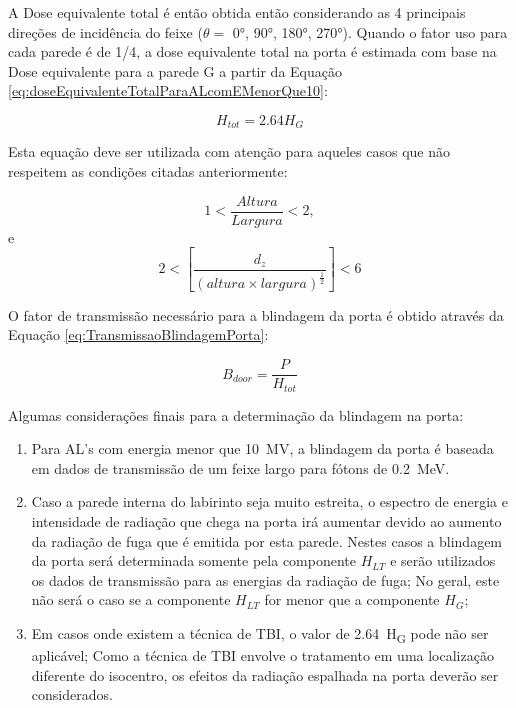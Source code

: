 \documentclass[11pt,a4paper]{article}
\begin{document}
            A Dose equivalente total é então obtida então considerando as 4 principais direções de incidência do feixe ($\theta = $ \ang{0}, \ang{90}, \ang{180}, \ang{270}).  Quando o fator uso para cada parede é de 1/4, a dose equivalente total na porta é estimada com base na Dose equivalente para a parede G a partir da Equação \ref{eq:doseEquivalenteTotalParaALcomEMenorQue10}:

                \begin{equation}
                     H_{tot} = 2.64 H_G
                    \label{eq:doseEquivalenteTotalParaALcomEMenorQue10}
                \end{equation}
                
            Esta equação deve ser utilizada com atenção para aqueles casos que não respeitem as condições citadas anteriormente: 

                $$1 < \frac{Altura}{Largura} < 2, $$ e
                $$2 < \left[\frac{d_z}{\left(altura \times largura\right)^\frac{1}{2}}\right] < 6$$

            O fator de transmissão necessário para a blindagem da porta é obtido através da Equação \ref{eq:TransmissaoBlindagemPorta}:

                \begin{equation}
                    B_{door} = \frac{P}{H_{tot}}
                    \label{eq:TransmissaoBlindagemPorta}
                \end{equation}
            

            Algumas considerações finais para a determinação da blindagem na porta:
            \begin{enumerate}
                \item Para AL's com energia menor que \qty{10}{MV}, a blindagem da porta é baseada em dados de transmissão de um feixe largo para fótons de \qty{0.2}{MeV}.
                \item Caso a parede interna do labirinto seja muito estreita, o espectro de energia e intensidade de radiação que chega na porta irá aumentar devido ao aumento da radiação de fuga que é emitida por esta parede. Nestes casos a blindagem da porta será determinada somente pela componente $H_{LT}$ e serão utilizados os dados de transmissão para as energias da radiação de fuga; No geral, este não será o caso se a componente $H_{LT}$ for menor que a componente $H_G$;
                \item Em casos onde existem a técnica de TBI, o valor de \qty{2.64}{H_G} pode não ser aplicável; Como a técnica de TBI envolve o tratamento em uma localização diferente do isocentro, os efeitos da radiação espalhada na porta deverão ser considerados. 
            \end{enumerate}
            
\end{document}
